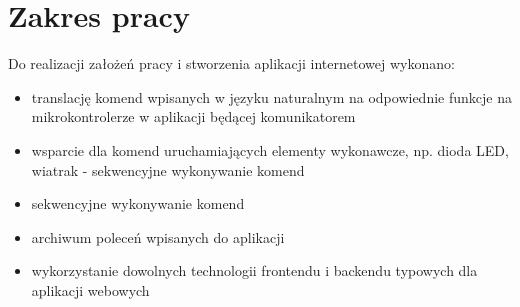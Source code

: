 \section{Zakres pracy}
Do realizacji założeń pracy i stworzenia aplikacji internetowej wykonano: 
\begin{itemize}  
	\item translację komend wpisanych w języku naturalnym na odpowiednie funkcje na mikrokontrolerze w aplikacji będącej komunikatorem
	\\
	\item wsparcie dla komend uruchamiających elementy wykonawcze, np. dioda LED, wiatrak - sekwencyjne wykonywanie komend
	\\
	\item sekwencyjne wykonywanie komend
	\\
	\item archiwum poleceń wpisanych do aplikacji
	\\
	\item wykorzystanie dowolnych technologii frontendu i backendu typowych dla aplikacji webowych
	\\
\end{itemize}